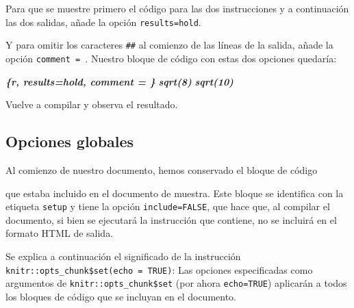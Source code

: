 \documentclass[
  degree=mecinf,
  title=normal,
  toc=normal,
  bib=normal]{mnye}
\newenvironment{Shaded}{\begin{snugshade}}{\end{snugshade}}
\newcommand{\InformationTok}[1]{\textcolor[rgb]{0.56,0.35,0.01}{\textbf{\textit{#1}}}}
\begin{document}
Para que se muestre primero el código para las dos instrucciones y a continuación las dos salidas, añade la opción \texttt{results=\textquotesingle{}hold\textquotesingle{}}.

Y para omitir los caracteres \texttt{\#\#} al comienzo de las líneas de la salida, añade la opción \texttt{comment\ =\ \textquotesingle{}\textquotesingle{}}. Nuestro bloque de código con estas dos opciones quedaría:

\begin{Shaded}
\begin{Highlighting}[]
\InformationTok{\textasciigrave{}\textasciigrave{}\textasciigrave{}\{r, results=\textquotesingle{}hold\textquotesingle{}, comment = \textquotesingle{}\textquotesingle{}\}}
\InformationTok{sqrt(8)}
\InformationTok{sqrt(10)}
\InformationTok{\textasciigrave{}\textasciigrave{}\textasciigrave{}}
\end{Highlighting}
\end{Shaded}

Vuelve a compilar y observa el resultado.

\hypertarget{global-options}{%
\subsection{Opciones globales}\label{global-options}}

Al comienzo de nuestro documento, hemos conservado el bloque de código

\begin{Shaded}
\end{Shaded}

que estaba incluido en el documento de muestra. Este bloque se identifica con la etiqueta \texttt{setup} y tiene la opción \texttt{include=FALSE}, que hace que, al compilar el documento, si bien se ejecutará la instrucción que contiene, no se incluirá en el formato HTML de salida.

Se explica a continuación el significado de la instrucción \texttt{knitr::opts\_chunk\$set(echo\ =\ TRUE)}: Las opciones especificadas como argumentos de \texttt{knitr::opts\_chunk\$set} (por ahora \texttt{echo=TRUE}) aplicarán a todos los bloques de código que se incluyan en el documento.
\end{document}
